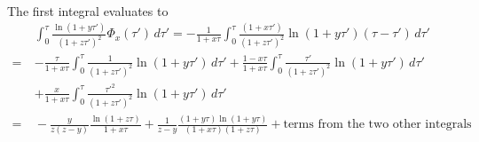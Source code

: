 \documentclass[11pt]{article}
\begin{document}
\begin{align}
\end{align}
The first integral evaluates to 
\begin{align}
    \quad &\int_0^{\tau} \frac{\ln(1+y\tau')}{(1+z\tau')^2} \Phi_x(\tau') \,d\tau'
    = -\frac{1}{1+x\tau} \int_0^{\tau} \frac{(1+x\tau')}{(1+z\tau')^2} \ln(1+y\tau')(\tau-\tau') \,d\tau' \\\nonumber
    =& -\frac{\tau}{1+x\tau}\int_0^{\tau} \frac{1}{(1+z\tau')^2} \ln(1+y\tau')\,d\tau'
    + \frac{1-x\tau}{1+x\tau}\int_0^{\tau} \frac{\tau'}{(1+z\tau')^2} \ln(1+y\tau')\,d\tau'\\\nonumber
    &+ \frac{x}{1+x\tau}\int_0^{\tau} \frac{\tau'^2}{(1+z\tau')^2} \ln(1+y\tau')\,d\tau'\\\nonumber
    =&{} -\frac{y}{z(z-y)}\frac{\ln(1+z\tau)}{1+x\tau} + \frac{1}{z-y}\frac{(1+y\tau)\ln(1+y\tau)}{(1+x\tau)(1+z\tau)}
    +\textrm{terms from the two other integrals}
\end{align}
\end{document}
